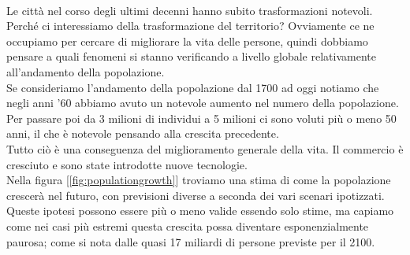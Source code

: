 \documentclass[a4paper,12pt, oneside]{book}
\begin{document}
\leavevmode\\
Le città nel corso degli ultimi decenni hanno subito trasformazioni notevoli.\\
Perché ci interessiamo della trasformazione del territorio? Ovviamente ce ne occupiamo per cercare di migliorare la vita delle persone, quindi dobbiamo pensare a quali fenomeni si stanno verificando a livello globale relativamente all'andamento della popolazione.\\
Se consideriamo l'andamento della popolazione dal 1700 ad oggi notiamo che negli anni '60 abbiamo avuto un notevole aumento nel numero della popolazione. Per passare poi da 3 milioni di individui a 5 milioni ci sono voluti più o meno 50 anni, il che è notevole pensando alla crescita precedente.\\
Tutto ciò è una conseguenza del miglioramento generale della vita. Il commercio è cresciuto e sono state introdotte nuove tecnologie.\\
Nella figura [\ref{fig:populationgrowth}] troviamo una stima di come la popolazione crescerà nel futuro, con previsioni diverse a seconda dei vari scenari ipotizzati. Queste ipotesi possono essere più o meno valide essendo solo stime, ma capiamo come nei casi più estremi questa crescita possa diventare esponenzialmente paurosa; come si nota dalle quasi 17 miliardi di persone previste per il 2100.
\leavevmode\\
\end{document}
